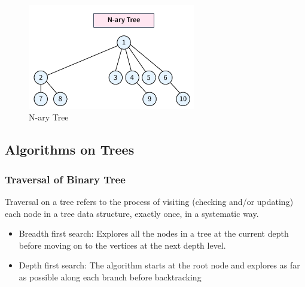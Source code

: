 \begin{figure}[H]
	\centering
	\includegraphics[width=0.65\textwidth]{figures/n-ary-tree}
	\caption{N-ary Tree}
	\label{fig:nary}
\end{figure}

\subsection{Algorithms on Trees}
\subsubsection{Traversal of Binary Tree}
\begin{tcolorbox}[title=Traversal of Binary Tree,coltitle =black,fonttitle=\large\bfseries,colback=green!5!white,colframe=green!75!black]
	Traversal on a tree refers to the process of visiting (checking and/or updating) each node in a tree data structure, exactly once, in a systematic way.
	\begin{itemize}
		\item Breadth first search: Explores all the nodes in a tree at the current depth before
		moving on to the vertices at the next depth level.
		\item Depth first search: The algorithm starts at the root node and explores as far as possible along each branch before backtracking
	\end{itemize}
\end{tcolorbox}

